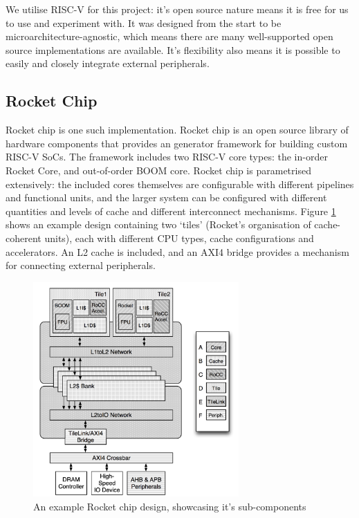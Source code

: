 We utilise RISC-V for this project: it's open source nature means it is free for us to use and experiment with. It was designed from the start to be microarchitecture-agnostic, which means there are many well-supported open source implementations are available. It's flexibility also means it is possible to easily and closely integrate external peripherals.


\subsection{Rocket Chip}

Rocket chip is one such implementation. Rocket chip is an open source library of hardware components that provides an generator framework for building custom RISC-V SoCs. The framework includes two RISC-V core types: the in-order Rocket Core, and out-of-order BOOM core. Rocket chip is parametrised extensively: the included cores themselves are configurable with different pipelines and functional units, and the larger system can be configured with different quantities and levels of cache and different interconnect mechanisms. Figure \ref{fig:rocket} shows an example design containing two `tiles' (Rocket's organisation of cache-coherent units), each with different CPU types, cache configurations and accelerators. An L2 cache is included, and an AXI4 bridge provides a mechanism for connecting external peripherals.

\begin{figure}[h!]
    \centering
    \includegraphics[width=0.7\textwidth]{../img/rocket-chip.png}
    \caption{An example Rocket chip design, showcasing it's sub-components \cite{rocketchip}}
    \label{fig:rocket}
\end{figure}

